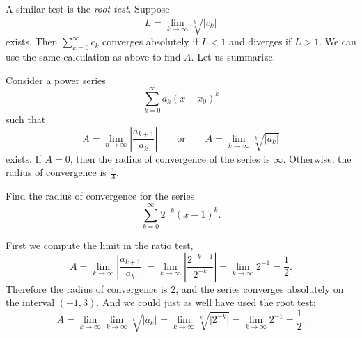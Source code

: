\documentclass{ximera}
\begin{document}
A similar test is the \emph{root test}. Suppose
\begin{equation*}
    L = \lim_{k\to\infty} \sqrt[k]{\lvert c_k \rvert}
\end{equation*}
exists.  Then $\sum_{k=0}^\infty c_k$ converges absolutely if $L < 1$ and diverges if $L > 1$.  We can use the same calculation as above to find $A$. Let us summarize.

\begin{theorem}
    Consider a power series
    \begin{equation*}
        \sum_{k=0}^\infty a_k {(x-x_0)}^k
    \end{equation*}
    such that
    \begin{equation*}
        A = \lim_{n\to\infty} \left \lvert \frac{a_{k+1}}{a_k} \right \rvert 
        \qquad \text{or} \qquad 
        A = \lim_{k\to\infty} \sqrt[k]{\lvert a_k \rvert}
    \end{equation*}
    exists. If $A = 0$, then the radius of convergence of the series is $\infty$.  Otherwise, the radius of convergence is $\frac{1}{A}$.
\end{theorem}

\begin{example}
    Find the radius of convergence for the series
    \begin{equation*}
        \sum_{k=0}^\infty 2^{-k} {(x-1)}^k .
    \end{equation*}
\end{example}

\begin{exampleSol}
    First we compute the limit in the ratio test,
    \begin{equation*}
    A = \lim_{k\to\infty} \left \lvert \frac{a_{k+1}}{a_k} \right \rvert
    =\lim_{k\to\infty} \left \lvert \frac{2^{-k-1}}{2^{-k}} \right \rvert
    = \lim_{k\to\infty} 2^{-1} = \frac{1}{2}.
    \end{equation*}
    Therefore the radius of convergence is $2$, and the series converges absolutely on the interval $(-1,3)$. And we could just as well have used the root test:
    \begin{equation*}
        A = \lim_{k\to\infty} \lim_{k\to\infty} \sqrt[k]{\lvert a_k \rvert} 
        = \lim_{k\to\infty} \sqrt[k]{\lvert 2^{-k} \rvert} 
        = \lim_{k\to\infty} 2^{-1} = \frac{1}{2}.
    \end{equation*}
\end{exampleSol}
\end{document}
